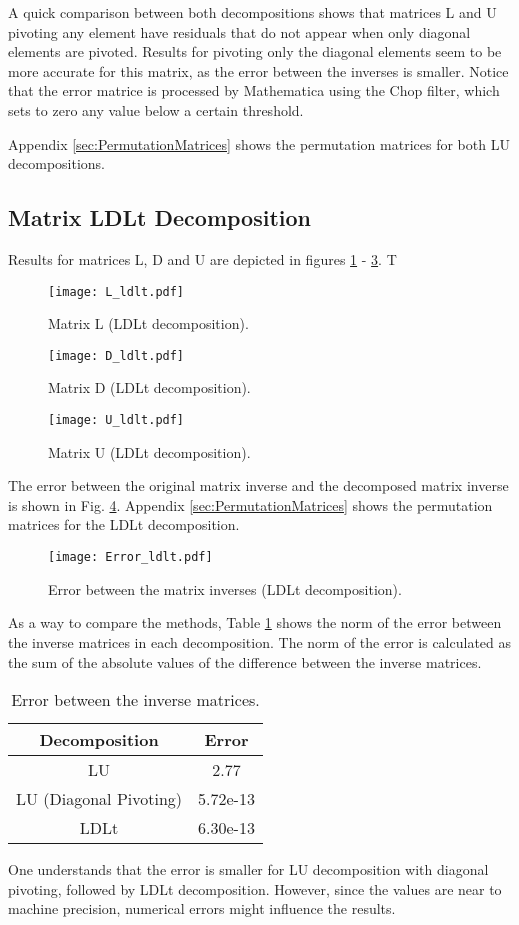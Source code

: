 A quick comparison between both decompositions shows that matrices L and U pivoting any element have residuals that do not appear when only diagonal elements are pivoted. Results for pivoting only the diagonal elements seem to be more accurate for this matrix, as the error between the inverses is smaller. Notice that the error matrice is processed by Mathematica using the Chop filter, which sets to zero any value below a certain threshold.

Appendix \ref{sec:PermutationMatrices} shows the permutation matrices for both LU decompositions. 

\subsection{Matrix LDLt Decomposition} \label{sec:ldlt}
Results for matrices L, D and U are depicted in figures \ref{fig:ldlt_L} - \ref{fig:ldlt_U}. T
\begin{figure}[H]
    \centering
    \texttt{[image: L\_ldlt.pdf]}
    \caption{Matrix L (LDLt decomposition).}
    \label{fig:ldlt_L}
\end{figure}
\begin{figure}[H]
    \centering
    \texttt{[image: D\_ldlt.pdf]}
    \caption{Matrix D (LDLt decomposition).}
    \label{fig:ldlt_D}
\end{figure}
\begin{figure}[H]
    \centering
    \texttt{[image: U\_ldlt.pdf]}
    \caption{Matrix U (LDLt decomposition).}
    \label{fig:ldlt_U}
\end{figure}

The error between the original matrix inverse and the decomposed matrix inverse is shown in Fig. \ref{fig:ldlt_inverse_error}.  Appendix \ref{sec:PermutationMatrices} shows the permutation matrices for the LDLt decomposition.
\begin{figure}[H]
    \centering
    \texttt{[image: Error\_ldlt.pdf]}
    \caption{Error between the matrix inverses (LDLt decomposition).}
    \label{fig:ldlt_inverse_error}
\end{figure}

As a way to compare the methods, Table \ref{tab:error} shows the norm of the error between the inverse matrices in each decomposition. The norm of the error is calculated as the sum of the absolute values of the difference between the inverse matrices. 
\begin{table}[H]
    \centering 
    \caption{Error between the inverse matrices.}
    \begin{tabular}{cc}
        \hline
        Decomposition & Error \\
        \hline
        LU & 2.77 \\ 
        LU (Diagonal Pivoting) & 5.72e-13 \\
        LDLt & 6.30e-13 \\ \hline
    \end{tabular}
    \label{tab:error}
\end{table}

One understands that the error is smaller for LU decomposition with diagonal pivoting, followed by LDLt decomposition. However, since the values are near to machine precision, numerical errors might influence the results.